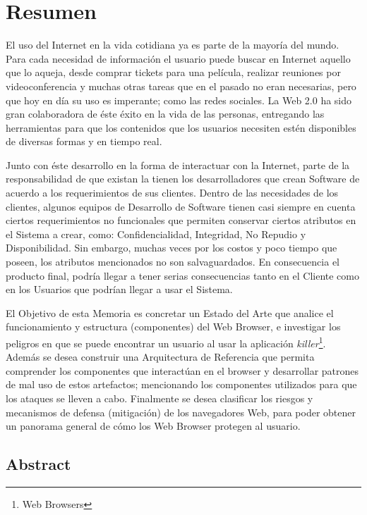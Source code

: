 
\chapter{Resumen}
\label{chap:resumen}

El uso del Internet en la vida cotidiana ya es parte de la mayoría del mundo. Para cada necesidad de información el usuario puede buscar en Internet aquello que lo aqueja, desde comprar tickets para una película, realizar reuniones por videoconferencia y muchas otras tareas que en el pasado no eran necesarias, pero que hoy en día su uso es imperante; como las redes sociales. La Web 2.0 ha sido gran colaboradora de éste éxito en la vida de las personas, entregando las herramientas para que los contenidos que los usuarios necesiten estén disponibles de diversas formas y en tiempo real.

Junto con éste desarrollo en la forma de interactuar con la Internet, parte de la responsabilidad de que existan la tienen los desarrolladores que crean Software de acuerdo a los requerimientos de sus clientes. Dentro de las necesidades de los clientes, algunos equipos de Desarrollo de Software tienen casi siempre en cuenta ciertos requerimientos no funcionales que permiten conservar ciertos atributos en el Sistema a crear, como: Confidencialidad, Integridad, No Repudio y Disponibilidad. Sin embargo, muchas veces por los costos y poco tiempo que poseen, los atributos mencionados no son salvaguardados. En consecuencia el producto final, podría llegar a tener serias consecuencias tanto en el Cliente como en los Usuarios que podrían llegar a usar el Sistema.

El Objetivo de esta Memoria es concretar un Estado del Arte que analice el funcionamiento y estructura (componentes) del Web Browser, e investigar los peligros en que se puede encontrar un usuario al usar la aplicación \textit{killer}\footnote{Web Browsers}. Además se desea construir una Arquitectura de Referencia que permita comprender los componentes que interactúan en el browser y desarrollar patrones de mal uso de estos artefactos; mencionando los componentes utilizados para que los ataques se lleven a cabo. Finalmente se desea clasificar los riesgos y mecanismos de defensa (mitigación) de los navegadores Web, para poder obtener un panorama general de cómo los Web Browser protegen al usuario.


\section*{Abstract}


